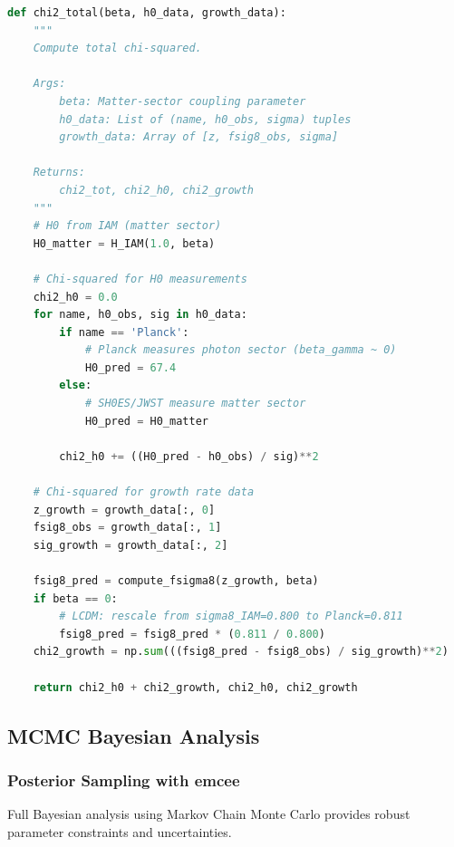 \documentclass[11pt]{article}
\begin{document}
\begin{lstlisting}[language=Python]
def chi2_total(beta, h0_data, growth_data):
    """
    Compute total chi-squared.
    
    Args:
        beta: Matter-sector coupling parameter
        h0_data: List of (name, h0_obs, sigma) tuples
        growth_data: Array of [z, fsig8_obs, sigma]
    
    Returns:
        chi2_tot, chi2_h0, chi2_growth
    """
    # H0 from IAM (matter sector)
    H0_matter = H_IAM(1.0, beta)
    
    # Chi-squared for H0 measurements
    chi2_h0 = 0.0
    for name, h0_obs, sig in h0_data:
        if name == 'Planck':
            # Planck measures photon sector (beta_gamma ~ 0)
            H0_pred = 67.4
        else:
            # SH0ES/JWST measure matter sector
            H0_pred = H0_matter
        
        chi2_h0 += ((H0_pred - h0_obs) / sig)**2
    
    # Chi-squared for growth rate data
    z_growth = growth_data[:, 0]
    fsig8_obs = growth_data[:, 1]
    sig_growth = growth_data[:, 2]
    
    fsig8_pred = compute_fsigma8(z_growth, beta)
    if beta == 0:
        # LCDM: rescale from sigma8_IAM=0.800 to Planck=0.811
        fsig8_pred = fsig8_pred * (0.811 / 0.800)
    chi2_growth = np.sum(((fsig8_pred - fsig8_obs) / sig_growth)**2)
    
    return chi2_h0 + chi2_growth, chi2_h0, chi2_growth
\end{lstlisting}

\subsection{MCMC Bayesian Analysis}

\subsubsection{Posterior Sampling with emcee}

Full Bayesian analysis using Markov Chain Monte Carlo provides robust parameter constraints and uncertainties.
\end{document}
